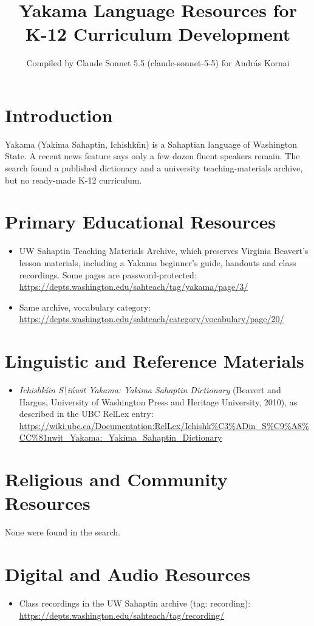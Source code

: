 \documentclass[12pt]{article}
\title{Yakama Language Resources for K-12 Curriculum Development}
\author{Compiled by Claude Sonnet 5.5 (claude-sonnet-5-5) for Andr\'as Kornai}
\date{}
\begin{document}
\maketitle

\section{Introduction}
Yakama (Yakima Sahaptin, Ichish\-k\'iin) is a Sahaptian language of Washington State. A recent news feature says only a few dozen fluent speakers remain. The search found a published dictionary and a university teaching-materials archive, but no ready-made K-12 curriculum.

\section{Primary Educational Resources}
\begin{itemize}
\item UW Sahaptin Teaching Materials Archive, which preserves Virginia Beavert's lesson materials, including a Yakama beginner's guide, handouts and class recordings. Some pages are password-protected: \url{https://depts.washington.edu/sahteach/tag/yakama/page/3/}
\item Same archive, vocabulary category: \url{https://depts.washington.edu/sahteach/category/vocabulary/page/20/}
\end{itemize}

\section{Linguistic and Reference Materials}
\begin{itemize}
\item \emph{Ichishk\'iin S\textbackslash i\'nwit Yakama: Yakima Sahaptin Dictionary} (Beavert and Hargus, University of Washington Press and Heritage University, 2010), as described in the UBC RelLex entry: \url{https://wiki.ubc.ca/Documentation:RelLex/Ichishk%C3%ADin_S%C9%A8%CC%81nwit_Yakama:_Yakima_Sahaptin_Dictionary}
\end{itemize}

\section{Religious and Community Resources}
None were found in the search.

\section{Digital and Audio Resources}
\begin{itemize}
\item Class recordings in the UW Sahaptin archive (tag: recording): \url{https://depts.washington.edu/sahteach/tag/recording/}
\end{itemize}
\end{document}
